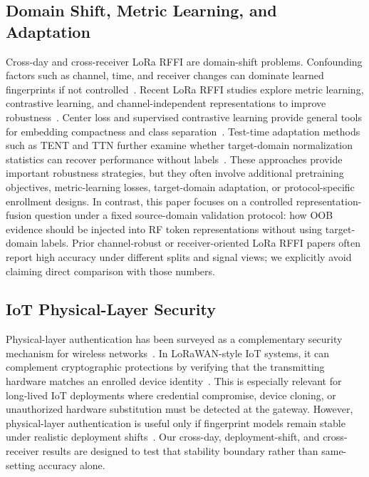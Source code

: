 \subsection{Domain Shift, Metric Learning, and Adaptation}
Cross-day and cross-receiver LoRa RFFI are domain-shift problems.
Confounding factors such as channel, time, and receiver changes can dominate learned fingerprints if not controlled~\cite{cekic2020robust_wireless_fingerprinting,alshawabka2020exposing_fingerprint,shen2022scalable_lora_rffi}.
Recent LoRa RFFI studies explore metric learning, contrastive learning, and channel-independent representations to improve robustness~\cite{shen2022scalable_lora_rffi,ma2025contrastive_lora_rffi,ma2025receiver_independent_rffi}.
Center loss and supervised contrastive learning provide general tools for embedding compactness and class separation~\cite{wen2016center_loss,khosla2020supcon}.
Test-time adaptation methods such as TENT and TTN further examine whether target-domain normalization statistics can recover performance without labels~\cite{wang2021tent,lim2023ttn}.
These approaches provide important robustness strategies, but they often involve additional pretraining objectives, metric-learning losses, target-domain adaptation, or protocol-specific enrollment designs.
In contrast, this paper focuses on a controlled representation-fusion question under a fixed source-domain validation protocol: how OOB evidence should be injected into RF token representations without using target-domain labels.
Prior channel-robust or receiver-oriented LoRa RFFI papers often report high accuracy under different splits and signal views; we explicitly avoid claiming direct comparison with those numbers.

\subsection{IoT Physical-Layer Security}
Physical-layer authentication has been surveyed as a complementary security mechanism for wireless networks~\cite{xie2021physical_layer_auth_survey}.
In LoRaWAN-style IoT systems, it can complement cryptographic protections by verifying that the transmitting hardware matches an enrolled device identity~\cite{lorawan_spec,hamdaoui2022deeplearning}.
This is especially relevant for long-lived IoT deployments where credential compromise, device cloning, or unauthorized hardware substitution must be detected at the gateway.
However, physical-layer authentication is useful only if fingerprint models remain stable under realistic deployment shifts~\cite{elmaghbub2021lora_wild}.
Our cross-day, deployment-shift, and cross-receiver results are designed to test that stability boundary rather than same-setting accuracy alone.

